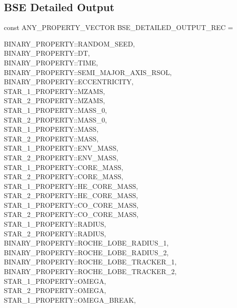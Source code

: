 \newpage 
\subsection{BSE Detailed Output}\label{sec:BSEDetailedOutput}

const ANY\_PROPERTY\_VECTOR BSE\_DETAILED\_OUTPUT\_REC = \lcb

\hfill
\begin{minipage}{\dimexpr\textwidth-2em}
    BINARY\_PROPERTY::RANDOM\_SEED, \\
    BINARY\_PROPERTY::DT, \\
    BINARY\_PROPERTY::TIME, \\
    BINARY\_PROPERTY::SEMI\_MAJOR\_AXIS\_RSOL, \\
    BINARY\_PROPERTY::ECCENTRICITY, \\
    STAR\_1\_PROPERTY::MZAMS, \\
    STAR\_2\_PROPERTY::MZAMS, \\
    STAR\_1\_PROPERTY::MASS\_0, \\
    STAR\_2\_PROPERTY::MASS\_0, \\
    STAR\_1\_PROPERTY::MASS, \\
    STAR\_2\_PROPERTY::MASS, \\
    STAR\_1\_PROPERTY::ENV\_MASS, \\
    STAR\_2\_PROPERTY::ENV\_MASS, \\
    STAR\_1\_PROPERTY::CORE\_MASS, \\
    STAR\_2\_PROPERTY::CORE\_MASS, \\
    STAR\_1\_PROPERTY::HE\_CORE\_MASS, \\
    STAR\_2\_PROPERTY::HE\_CORE\_MASS, \\
    STAR\_1\_PROPERTY::CO\_CORE\_MASS, \\
    STAR\_2\_PROPERTY::CO\_CORE\_MASS, \\
    STAR\_1\_PROPERTY::RADIUS, \\
    STAR\_2\_PROPERTY::RADIUS, \\
    BINARY\_PROPERTY::ROCHE\_LOBE\_RADIUS\_1, \\
    BINARY\_PROPERTY::ROCHE\_LOBE\_RADIUS\_2, \\
    BINARY\_PROPERTY::ROCHE\_LOBE\_TRACKER\_1, \\
    BINARY\_PROPERTY::ROCHE\_LOBE\_TRACKER\_2, \\
    STAR\_1\_PROPERTY::OMEGA, \\
    STAR\_2\_PROPERTY::OMEGA, \\
    STAR\_1\_PROPERTY::OMEGA\_BREAK, \\

\end{minipage}
